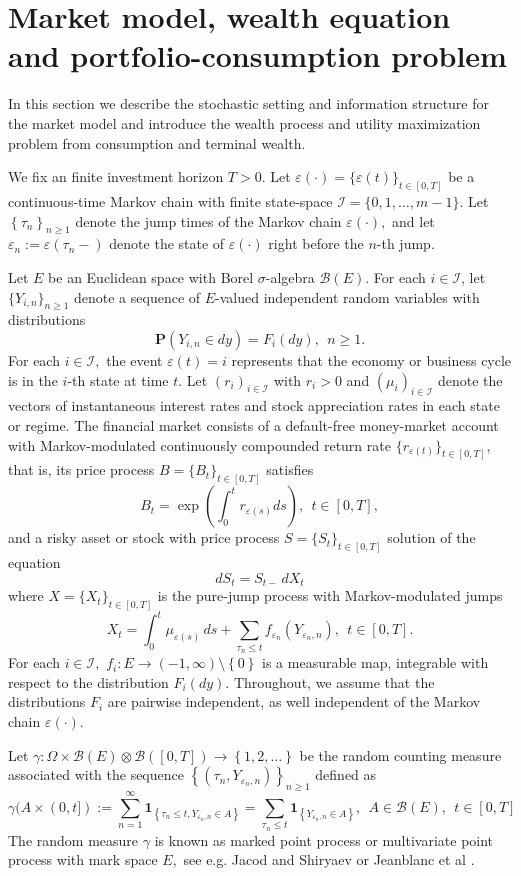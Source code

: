 \documentclass[11pt]{article}
\theoremstyle{plain}
\theoremstyle{definition}
\numberwithin{equation}{section}
\newcommand{\set}[1]{\left\{#1\right\}}
\newcommand{\calI}{\mathcal{I}}
\newcommand{\eps}{\varepsilon}
\newcommand{\Prob}{\mathbf{P}}
\newcommand{\B}{\mathcal{B}}
\begin{document}
\section{Market model, wealth equation and portfolio-consumption problem}
In this section we describe the stochastic setting and information structure for the market model  and introduce the wealth process and utility maximization problem from consumption and terminal wealth.

We fix an finite investment horizon $T>0.$ Let $\eps(\cdot)=\{\eps(t)\}_{t\in[0,T]}$ be a continuous-time Markov chain with finite state-space $\mathcal{I}=\{0,1,\ldots,m-1\}.$ Let $\set{\tau_n}_{n\geq 1}$ denote the jump times of the Markov chain $\eps(\cdot),$ and let $\eps_n:=\eps(\tau_n-)$ denote the state of $\eps(\cdot)$ right before the $n$-th jump.

Let $E$ be an Euclidean space with Borel $\sigma$-algebra $\B(E).$ For each $i\in\mathcal{I}$, let $\{Y_{i,n}\}_{n\geq 1}$ denote a sequence of $E$-valued independent random variables with distributions
\[
\Prob(Y_{i,n}\in dy)={F}_i(dy), \ \ n\geq 1.
\]
For each $i\in\mathcal{I},$ the event $\eps(t)=i$ represents that the economy or business cycle is in the $i$-th state at time $t.$ Let $(r_i)_{i\in\calI}$ with $r_i>0$ and $(\mu_i)_{i\in\calI}$ denote the vectors of instantaneous interest rates and stock appreciation rates in each state or regime. The financial market consists of a default-free money-market account with Markov-modulated continuously compounded return rate $\{r_{\eps(t)}\}_{t\in[0,T]},$ that is, its price process $B=\{B_t\}_{t\in[0,T]}$ satisfies
\[
B_t=\exp\left(\int_0^tr_{\eps(s)}ds\right), \ \ t\in[0,T],
\]
and a risky asset or stock with price process $S=\{S_t\}_{t\in[0,T]}$ solution of the equation
\begin{equation}\label{eqS0}
dS_t=S_{t-}\,dX_t
\end{equation}
where $X=\{X_t\}_{t\in[0,T]}$ is the pure-jump process with Markov-modulated jumps
\[
X_t=\int_0^t\mu_{\eps(s)}\,ds+\sum_{\tau_n\le t}f_{\eps_n}(Y_{\eps_n,n}), \ \ t\in[0,T].
\]
For each $i\in\calI,$ $f_i:E\rightarrow (-1,\infty)\setminus\set{0}$ is a measurable map, integrable with respect to the distribution $F_i(dy).$ Throughout, we assume that the distributions $F_i$ are pairwise independent, as well independent of the Markov chain $\eps(\cdot).$

Let $\gamma:\Omega\times \B(E)\otimes\B([0,T])\to\set{1,2,\ldots}$ be the random counting measure associated with the  sequence $\set{(\tau_n,Y_{\eps_n,n})}_{n\geq 1}$ defined as
\[
\gamma(A\times(0,t]):=\sum_{n=1}^\infty\mathbf{1}_{\set{\tau_n\le t,Y_{\eps_n,n}\in A}}=\sum_{\tau_n\le t}\mathbf{1}_{\set{Y_{\eps_n,n}\in A}}, \ \ A\in\mathcal{B}(E), \ \ t\in [0,T]
\]
The random measure $\gamma$ is known as marked point process or multivariate point process with mark space $E,$ see e.g. Jacod and Shiryaev \cite[Chapter III, Definition 1.23]{js} or Jeanblanc et al \cite[Section 8.8]{jeanblanc}.
\end{document}
